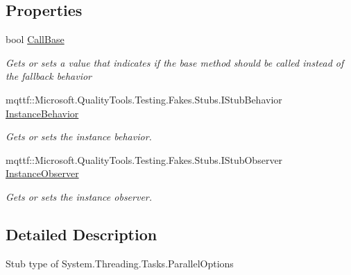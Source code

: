 \subsection*{Properties}
\begin{DoxyCompactItemize}
\item 
bool \hyperlink{class_system_1_1_threading_1_1_tasks_1_1_fakes_1_1_stub_parallel_options_a5adf0f5596893f515f49d6694ef1b974}{Call\-Base}
\begin{DoxyCompactList}\small\item\em Gets or sets a value that indicates if the base method should be called instead of the fallback behavior\end{DoxyCompactList}\item 
mqttf\-::\-Microsoft.\-Quality\-Tools.\-Testing.\-Fakes.\-Stubs.\-I\-Stub\-Behavior \hyperlink{class_system_1_1_threading_1_1_tasks_1_1_fakes_1_1_stub_parallel_options_a1a4fa922dc7c9a191da7a95a1f2ea3fc}{Instance\-Behavior}
\begin{DoxyCompactList}\small\item\em Gets or sets the instance behavior.\end{DoxyCompactList}\item 
mqttf\-::\-Microsoft.\-Quality\-Tools.\-Testing.\-Fakes.\-Stubs.\-I\-Stub\-Observer \hyperlink{class_system_1_1_threading_1_1_tasks_1_1_fakes_1_1_stub_parallel_options_abe912d87cbac546ff25d437c9fe9c0e5}{Instance\-Observer}
\begin{DoxyCompactList}\small\item\em Gets or sets the instance observer.\end{DoxyCompactList}\end{DoxyCompactItemize}


\subsection{Detailed Description}
Stub type of System.\-Threading.\-Tasks.\-Parallel\-Options



